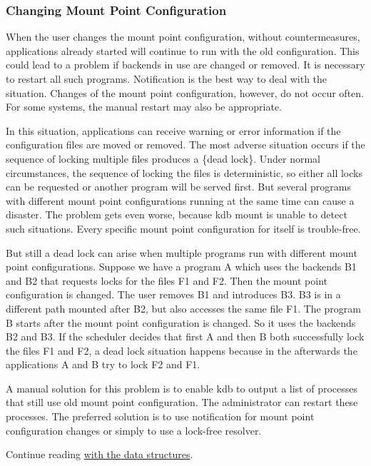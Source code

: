 \subsubsection*{Changing Mount Point Configuration}

When the user changes the mount point configuration, without countermeasures, applications already started will continue to run with the old configuration. This could lead to a problem if backends in use are changed or removed. It is necessary to restart all such programs. Notification is the best way to deal with the situation. Changes of the mount point configuration, however, do not occur often. For some systems, the manual restart may also be appropriate.

In this situation, applications can receive warning or error information if the configuration files are moved or removed. The most adverse situation occurs if the sequence of locking multiple files produces a \{dead lock\}. Under normal circumstances, the sequence of locking the files is deterministic, so either all locks can be requested or another program will be served first. But several programs with different mount point configurations running at the same time can cause a disaster. The problem gets even worse, because {\ttfamily kdb mount} is unable to detect such situations. Every specific mount point configuration for itself is trouble-\/free.

But still a dead lock can arise when multiple programs run with different mount point configurations. Suppose we have a program {\ttfamily A} which uses the backends {\ttfamily B1} and {\ttfamily B2} that requests locks for the files {\ttfamily F1} and {\ttfamily F2}. Then the mount point configuration is changed. The user removes {\ttfamily B1} and introduces {\ttfamily B3}. {\ttfamily B3} is in a different path mounted after {\ttfamily B2}, but also accesses the same file {\ttfamily F1}. The program {\ttfamily B} starts after the mount point configuration is changed. So it uses the backends {\ttfamily B2} and {\ttfamily B3}. If the scheduler decides that first {\ttfamily A} and then {\ttfamily B} both successfully lock the files {\ttfamily F1} and {\ttfamily F2}, a dead lock situation happens because in the afterwards the applications {\ttfamily A} and {\ttfamily B} try to lock {\ttfamily F2} and {\ttfamily F1}.

A manual solution for this problem is to enable {\ttfamily kdb} to output a list of processes that still use old mount point configuration. The administrator can restart these processes. The preferred solution is to use notification for mount point configuration changes or simply to use a lock-\/free resolver.

Continue reading \hyperlink{md_doc_help_elektra-data-structures_doc_help_elektra-data-structures_md}{with the data structures}. 